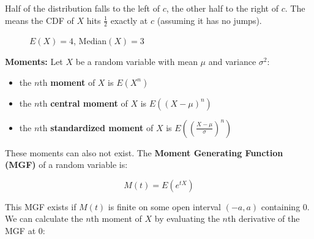 \documentclass[12pt]{article}
\begin{document}
\noindent
Half of the distribution falls to the left of $c$, the other half to the right of $c$.
The means the CDF of $X$ hits $\frac{1}{2}$ exactly at $c$ (assuming it has no jumps).

\PMFExpectedMean

\begin{figure}[h]
    \centering
    \caption{$E(X) = 4$, Median$(X) = 3$}
\end{figure}


\noindent
\textbf{Moments:}
Let $X$ be a random variable with mean $\mu$ and variance $\sigma^2$:

\begin{itemize}
    \item the $n$th \textbf{moment} of $X$ is $E(X^n)$
    \item the $n$th \textbf{central moment} of $X$ is $E((X - \mu)^n)$
    \item the $n$th \textbf{standardized moment} of $X$ is $E((\frac{X - \mu}{\sigma})^n)$
\end{itemize}

\noindent
These moments can also not exist.
The \textbf{Moment Generating Function (MGF)} of a random variable is:

\[ M(t) = E(e^{tX}) \]

\noindent
This MGF exists if $M(t)$ is finite on some open interval $(-a, a)$ containing 0.
We can calculate the $n$th moment of $X$ by evaluating the $n$th derivative of the MGF at 0:
\end{document}
